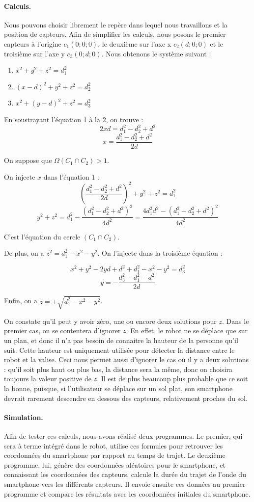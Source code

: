\documentclass{article}
\begin{document}
\paragraph{Calculs.}
Nous pouvons choisir librement le repère dans lequel nous travaillons et la position de capteurs. Afin de simplifier les calculs, nous posons le premier capteurs à l'origine $c_1(0;0;0)$, le deuxième sur l'axe x $c_2(d;0;0)$ et le troisième sur l'axe y $c_3(0;d;0)$. Nous obtenons le système suivant :
\begin{enumerate}
    \item $x^2 + y^2 + z^2 = d_1^2$
    \item $(x-d)^2 + y^2 + z^2 = d_2^2$
    \item $x^2 + (y-d)^2 + z^2 = d_3^2$
\end{enumerate}

En soustrayant l'équation 1 à la 2, on trouve :
\[2xd=d_1^2-d_2^2+d^2\]
\[x = \frac{d_1^2- d_2^2 + d^2}{2d}\]

On suppose que $\Omega(C_1 \cap C_2) > 1$.

On injecte $x$ dans l'équation 1 :
\[ \left(\frac{d_1^2-d_2^2+d^2}{2d}\right)^2 + y^2 + z^2 = d_1^2 \]
\[ y^2 + z^2 = d_1^2 - \frac{(d_1^2 - d_2^2 + d^2)^2}{4d^2} = \frac{4d_1^2d^2 - (d_1^2 - d_2^2 + d^2)^2}{4d^2} \]

C'est l'équation du cercle $(C_1 \cap C_2)$.

De plus, on a $z^2 = d_1^2-x^2-y^2$. On l'injecte dans la troisième équation :

\[ x^2 + y^2 - 2yd + d^2 + d_1^2 - x^2 - y^2 = d_3^2 \]
\[ y = -\frac{d_3^2 - d_1^2 - d^2}{2d} \]

Enfin, on a $z = \pm\sqrt{d_1^2-x^2-y^2}$.

On constate qu'il peut y avoir zéro, une ou encore deux solutions pour $z$. Dans le premier cas, on se contentera d'ignorer $z$. En effet, le robot ne se déplace que sur un plan, et donc il n'a pas besoin de connaitre la hauteur de la personne qu'il suit. Cette hauteur est uniquement utilisée pour détecter la distance entre le robot et la valise. Ceci nous permet aussi d'ignorer le cas où il y a deux solutions : qu'il soit plus haut ou plus bas, la distance sera la même, donc on choisira toujours la valeur positive de $z$. Il est de plus beaucoup plus probable que ce soit la bonne, puisque, si l'utilisateur se déplace sur un sol plat, son smartphone devrait rarement descendre en dessous des capteurs, relativement proches du sol.

\paragraph{Simulation.}
Afin de tester ces calculs, nous avons réalisé deux programmes. Le premier, qui sera à terme intégré dans le robot, utilise ces formules pour retrouver les coordonnées du smartphone par rapport au temps de trajet. Le deuxième programme, lui, génère des coordonnées aléatoires pour le smartphone, et connaissant les coordonnées des capteurs, calcule la durée du trajet de l'onde du smartphone vers les différents capteurs. Il envoie ensuite ces données au premier programme et compare les résultats avec les coordonnées initiales du smartphone.
\end{document}
